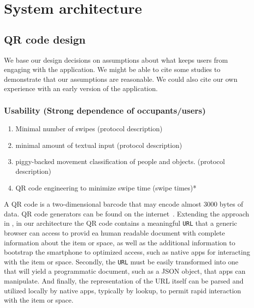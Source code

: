 \section{System architecture}

\subsection{QR code design}
\label{sec:qrc}
We base our design decisions on assumptions about what keeps users from engaging with the application.  We might be able to cite some studies to demonstrate that our assumptions are reasonable.  We could also cite our own experience with an early version of the application.

\subsubsection{Usability (Strong dependence of occupants/users)}
\begin{enumerate}
\item Minimal number of swipes (protocol description)
\item minimal amount of textual input (protocol description)
\item piggy-backed movement classification of people and objects. (protocol description)
\item QR code engineering to minimize swipe time (swipe times)*
\end{enumerate}



A QR code is a two-dimensional barcode that may encode almost 3000 bytes of data.  QR code generators
can be found on the internet~\cite{qrcgen1, qrcgen2}.  
Extending the approach in \cite{hbci}, in
our
architecture the QR code contains a meaningful {\tt URL} that a
generic browser can access to provid ea human readable document with complete
information about the item or space, as well as the additional
information to bootstrap the smartphone to optimized access, such as
native apps for interacting with the item or space.  Secondly, the 
{\tt URL}  must be easily transformed into one that will yield a
programmatic document, such as a JSON object, that apps can
manipulate.  And finally, the representation of the URL itself can be
parsed and utilized locally by native apps, typically by lookup, to
permit rapid interaction with the item or space.

